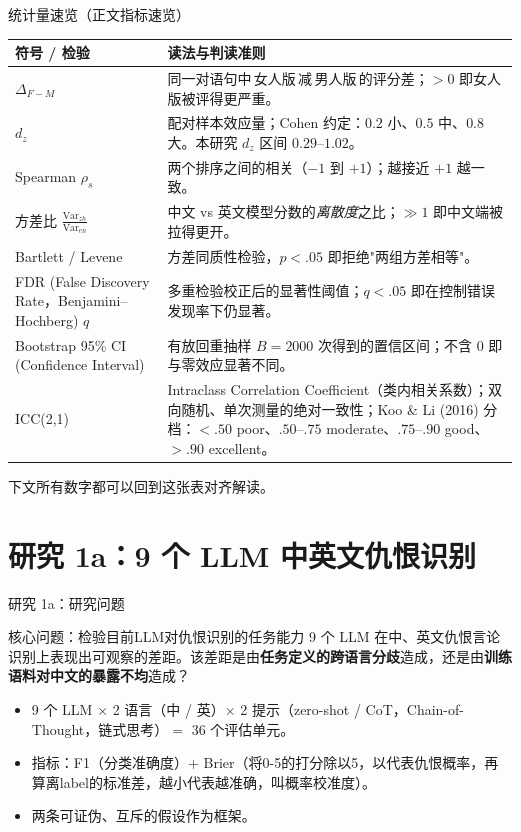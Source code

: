 \documentclass[aspectratio=169,professionalfonts]{beamer}
\begin{document}
\begin{frame}{统计量速览（正文指标速览）}
  \footnotesize
  \setlength{\tabcolsep}{4pt}
  \begin{tabular}{p{}p{}}
    \toprule
    符号 / 检验 & 读法与判读准则 \\
    \midrule
    $\Delta_{F-M}$ & 同一对语句中\,女人版\,减\,男人版\,的评分差；$>0$ 即女人版被评得更严重。 \\
    $d_z$         & 配对样本效应量；Cohen 约定：$0.2$ 小、$0.5$ 中、$0.8$ 大。本研究 $d_z$ 区间 $0.29$--$1.02$。 \\
    Spearman $\rho_s$ & 两个排序之间的相关（$-1$ 到 $+1$）；越接近 $+1$ 越一致。 \\
    方差比 $\frac{\text{Var}_{zh}}{\text{Var}_{en}}$ & 中文 vs 英文模型分数的\emph{离散度}之比；$\gg 1$ 即中文端被拉得更开。 \\
    Bartlett / Levene & 方差同质性检验，$p<.05$ 即拒绝"两组方差相等"。 \\
    FDR (False Discovery Rate，Benjamini--Hochberg) $q$ & 多重检验校正后的显著性阈值；$q<.05$ 即在控制错误发现率下仍显著。 \\
    Bootstrap 95\% CI (Confidence Interval) & 有放回重抽样 $B=2000$ 次得到的置信区间；不含 $0$ 即与零效应显著不同。 \\
    ICC(2,1) & Intraclass Correlation Coefficient（类内相关系数）；双向随机、单次测量的绝对一致性；Koo \& Li (2016) 分档：$<.50$ poor、$.50$--$.75$ moderate、$.75$--$.90$ good、$>.90$ excellent。 \\
    \bottomrule
  \end{tabular}

  \vspace{0.3em}
  \small 下文所有数字都可以回到这张表对齐解读。
\end{frame}

\section{研究 1a：9 个 LLM 中英文仇恨识别}

\begin{frame}{研究 1a：研究问题}
  \begin{block}{核心问题：检验目前LLM对仇恨识别的任务能力}
    \small 9 个 LLM 在中、英文仇恨言论识别上表现出可观察的差距。该差距是由\textbf{任务定义的跨语言分歧}造成，还是由\textbf{训练语料对中文的暴露不均}造成？
  \end{block}

  \vspace{0.4em}
  \begin{itemize}
    \item 9 个 LLM $\times$ 2 语言（中 / 英）$\times$ 2 提示（zero-shot / CoT，Chain-of-Thought，链式思考）$=$ 36 个评估单元。
    \item 指标：F1（分类准确度）+ Brier（将0-5的打分除以5，以代表仇恨概率，再算离label的标准差，越小代表越准确，叫概率校准度）。
    \item 两条可证伪、互斥的假设作为框架。
  \end{itemize}
\end{frame}
\end{document}
